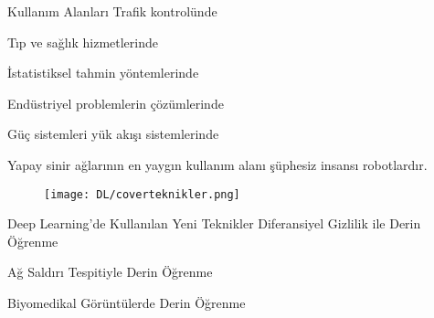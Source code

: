 \documentclass{beamer}                                                                                          %
\begin{document}
   
    \begin{frame}{Kullanım Alanları}
        \renewcommand{\labelitem}{}
        \renewcommand\labelitemii{$\square$}
                \color{myred1} \color{black}Trafik kontrolünde \par \vspace{10}
                \color{myred1} \color{black}Tıp ve sağlık hizmetlerinde \par \vspace{10}
                \color{myred1} \color{black}İstatistiksel tahmin yöntemlerinde \par \vspace{10}
                \color{myred1} \color{black}Endüstriyel problemlerin çözümlerinde \par \vspace{10}
                \color{myred1} \color{black}Güç sistemleri yük akışı sistemlerinde \par \vspace{15}
        Yapay sinir ağlarının en yaygın kullanım alanı şüphesiz insansı robotlardır.
	\end{frame}
    
   
    \begin{frame}{}
        \begin{center}
            \begin{figure}
                \vspace*{-7mm}
                \hspace*{-18.5 pt}
                \centering
                \texttt{[image: DL/coverteknikler.png]}
            \end{figure}
        \end{center}
    \end{frame}
    
    
    \begin{frame}{Deep Learning'de Kullanılan Yeni Teknikler}
        \justifying
        \color{myred1} \color{black}Diferansiyel Gizlilik ile Derin Öğrenme\par \vspace{15}
        \color{myred1} \color{black}Ağ Saldırı Tespitiyle Derin Öğrenme\par \vspace{15}
        \color{myred1} \color{black}Biyomedikal Görüntülerde Derin Öğrenme
    \end{frame}
    
\end{document}
